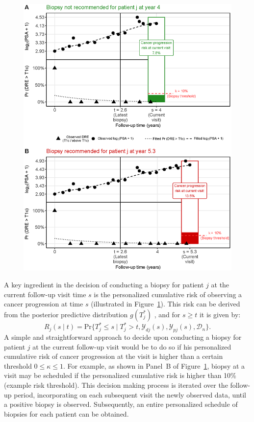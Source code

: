 \documentclass[a4paper, 12pt]{article}
\begin{document}
\begin{figure}[!htb]
\captionsetup{justification=justified}
\centerline{\includegraphics[width=\columnwidth]{Figure4.eps}}

\label{Figure4}
\end{figure}

A key ingredient in the decision of conducting a biopsy for patient $j$ at the current follow-up visit time $s$ is the personalized cumulative risk of observing a cancer progression at time $s$ (illustrated in Figure~\ref{Figure4}). This risk can be derived from the posterior predictive distribution $g(T^*_j)$ \citep{rizopoulos2011dynamic}, and for $s \geq t$ it is given by:
\begin{equation}
\label{eq:dynamic_risk_prob}
R_j(s \mid t) = \mbox{Pr}\big\{T^*_j \leq s \mid T^*_j > t, \mathcal{Y}_{dj}(s), \mathcal{Y}_{pj}(s), \mathcal{D}_n\big\}.
\end{equation}
A simple and straightforward approach to decide upon conducting a biopsy for patient $j$ at the current follow-up visit would be to do so if his personalized cumulative risk of cancer progression at the visit is higher than a certain threshold $0 \leq \kappa \leq 1$. For example, as shown in Panel~B of Figure~\ref{Figure4}, biopsy at a visit may be scheduled if the personalized cumulative risk is higher than 10\% (example risk threshold). This decision making process is iterated over the follow-up period, incorporating on each subsequent visit the newly observed data, until a positive biopsy is observed. Subsequently, an entire personalized schedule of biopsies for each patient can be obtained.
\end{document}
